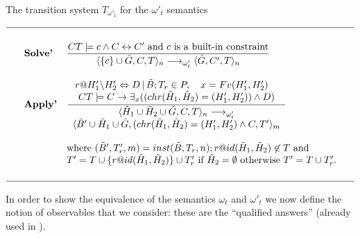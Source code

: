 \documentclass[final]{acmtrans2e}
\newcommand{\rrarrow}{\longrightarrow}
\begin{document}
\begin{table*}[t]
\caption{The transition system $T_{\omega'_t}$ for the $\omega'_t$ semantics}
\centering
\label{tab:operational-semantics}
$$
\begin{array}{llll}

\hline\noalign{\smallskip}
&&&\\

\mbox{   }&\textbf{Solve'}&\displaystyle\frac{CT\models c\wedge
C\leftrightarrow C' \mbox{ and } c \mbox{ is a built-in
constraint}} {\langle\{c\}\cup \tilde G, C,
T\rangle_n\rrarrow_{\omega'_t}
\langle \tilde G, C', T\rangle_n}&\mbox{   }\\

&&&\\

&\textbf{Apply'}&\displaystyle\frac{
\begin{array}{c}
r@H'_1\backslash H'_2
\Leftrightarrow D\, | \, \tilde B ; T_r\in P,  \quad x=Fv(H'_1,
H'_2)\quad \\
CT\models C\rightarrow \exists_x((chr(\tilde H_1,
\tilde H_2)=(H'_1, H'_2))\wedge D)
\end{array} } {
\begin{array}{c}
\langle \tilde H_1\cup \tilde
H_2\cup \tilde G, C, T \rangle_n\rrarrow _{\omega'_t} \\
\langle \tilde B' \cup \tilde H_1\cup \tilde G, (chr(\tilde H_1,
\tilde H_2)=(H'_1, H'_2)\wedge C, T'\rangle_{m}
\end{array}
}&\mbox{   }\\

&&&\\

&&\mbox{where  } (\tilde B', T'_r,m )= inst(\tilde B,T_r,n);
r @id(\tilde H_1, \tilde H_2)\not\in T \mbox{ and } &\mbox{   }\\
&&T'=T\cup \{r @id(\tilde H_1, \tilde H_2)\} \cup T'_r \mbox{ if }
\tilde H_2=\emptyset \mbox{ otherwise } T'=T\cup T'_r
.&\mbox{   }\\
&&&\\
\noalign{\smallskip}\hline
\end{array}
$$
\end{table*}






In order to show the equivalence of the semantics $\omega_t$ and
$\omega'_t$ we now define the  notion of observables that we
consider: these are the ``qualified answers'' (already used in
\cite{Fru98}).
\end{document}
